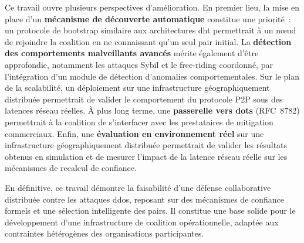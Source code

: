 Ce travail ouvre plusieurs perspectives d'amélioration. En premier lieu, la mise en place d'un \textbf{mécanisme de découverte automatique} constitue une priorité~: un protocole de bootstrap similaire aux architectures \gls{dht} permettrait à un n\oe{}ud de rejoindre la coalition en ne connaissant qu'un seul pair initial. La \textbf{détection des comportements malveillants avancés} mérite également d'être approfondie, notamment les attaques Sybil et le free-riding coordonné, par l'intégration d'un module de détection d'anomalies comportementales. Sur le plan de la scalabilité, un déploiement sur une infrastructure géographiquement distribuée permettrait de valider le comportement du protocole P2P sous des latences réseau réelles. À plus long terme, une \textbf{passerelle vers \gls{dots}} (RFC~8782) permettrait à la coalition de s'interfacer avec les prestataires de mitigation commerciaux. Enfin, une \textbf{évaluation en environnement réel} sur une infrastructure géographiquement distribuée permettrait de valider les résultats obtenus en simulation et de mesurer l'impact de la latence réseau réelle sur les mécanismes de recalcul de confiance.

En définitive, ce travail démontre la faisabilité d'une défense collaborative distribuée contre les attaques \gls{ddos}, reposant sur des mécanismes de confiance formels et une sélection intelligente des pairs. Il constitue une base solide pour le développement d'une infrastructure de coalition opérationnelle, adaptée aux contraintes hétérogènes des organisations participantes.
